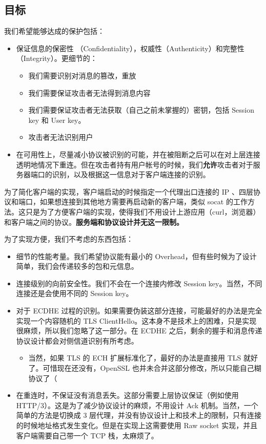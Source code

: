 \documentclass{ctexart}
\begin{document}
  \subsection{目标}

  我们希望能够达成的保护包括：

  \begin{itemize}
    \item 保证信息的保密性 （Confidentiality），权威性（Authenticity）和完整性（Integrity）。更细节的：
    \begin{itemize}
      \item 我们需要识别对消息的篡改，重放
      \item 我们需要保证攻击者无法得到消息内容
      \item 我们需要保证攻击者无法获取（自己之前未掌握的）密钥，包括 Session key 和 User key。
      \item 攻击者无法识别用户
    \end{itemize}
    \item 在可用性上，尽量减小协议被识别的可能，并在被阻断之后可以在对上层连接透明地情况下重连。但在攻击者持有用户帐号的时候，我们\textbf{允许}攻击者对于服务器端口的识别，以及根据这一信息对于客户端连接的识别。
  \end{itemize}

  为了简化客户端的实现，客户端启动的时候指定一个代理出口连接的 IP 、四层协议和端口，如果想连接到其他地方需要再启动新的客户端，类似 socat 的工作方法。这只是为了方便客户端的实现，使得我们不用设计上游应用（curl，浏览器）和客户端之间的协议。\textbf{服务端和协议设计并无这一限制。}

  \vspace*{1em}

  为了实现方便，我们不考虑的东西包括：

  \begin{itemize}
    \item 细节的性能考量。我们希望协议能有最小的 Overhead，但有些时候为了设计简单，我们会传递较多的包和元信息。
    \item 连接级别的向前安全性。我们不会在一个连接内修改 Session key。当然，不同连接还是会使用不同的 Session key。
    \item 对于 ECDHE 过程的识别。如果需要伪装这部分连接，可能最好的办法是完全实现一个内容随机的 TLS ClientHello。这本身不是技术上的困难，只是实现很麻烦，所以我们忽略了这一部分。在 ECDHE 之后，剩余的握手和消息传递协议设计都会对侧信道识别有所考虑。
    \begin{itemize}
      \item 当然，如果 TLS 的 ECH 扩展标准化了，最好的办法是直接用 TLS 就好了。可惜现在还没有，OpenSSL 也并未合并这部分修改，所以只能自己糊协议了（
    \end{itemize}
    \item 在重连时，不保证没有消息丢失。这部分需要上层协议保证（例如使用 HTTP/3）。这是为了减少协议设计的麻烦，不用设计 Ack 机制。当然，一个简单的方法是切换成 3 层代理，并没有协议设计上和技术上的限制，只有连接的时候地址格式发生变化。但是在实现上这需要使用 Raw socket 实现，并且客户端需要自己带一个 TCP 栈，太麻烦了。
  \end{itemize}
\end{document}
